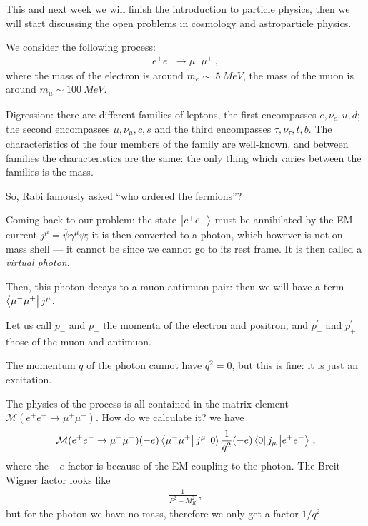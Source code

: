 \documentclass[main.tex]{subfiles}
\begin{document}

This and next week we will finish the introduction to particle physics, then we will start discussing the open problems in cosmology and astroparticle physics. 

We consider the following process: 
%
\begin{align}
e^{+} e^{-} \to \mu^- \mu^+
\,,
\end{align}
%
where the mass of the electron is around \(m_e \sim \SI{.5}{MeV}\), the mass of the muon is around \(m_{\mu } \sim \SI{100}{MeV}\). 

Digression: there are different families of leptons, the first encompasses \(e, \nu_{e}, u, d\); the second encompasses \(\mu, \nu_{\mu }, c, s\) and the third encompasses \(\tau, \nu_{\tau }, t, b\). 
The characteristics of the four members of the family are well-known, and between families the characteristics are the same: the only thing which varies between the families is the mass. 

So, Rabi famously asked ``who ordered the fermions''? 

Coming back to our problem: the state \(\ket{e^{+}e^{-}}\) must be annihilated by the EM current \(j^{\mu } = \overline{\psi} \gamma^{\mu } \psi \); it is then converted to a photon, which however is not on mass shell --- it cannot be since we cannot go to its rest frame. 
It is then called a \emph{virtual photon}. 

Then, this photon decays to a muon-antimuon pair: then we will have a term \(\bra{\mu^- \mu^+} j^{\mu }\).

Let us call \(p_{-}\) and \(p_{+}\) the momenta of the electron and positron, and \(p^{\prime }_{-}\) and \(p^{\prime }_{+}\) those of the muon and antimuon. 

The momentum \(q\) of the photon cannot have \(q^2  =0 \), but this is fine: it is just an excitation. 

The physics of the process is all contained in the matrix element \(\mathcal{M}(e^{+}e^{-} \to \mu^+ \mu^-)\). How do we calculate it? we have 
%
\begin{align}
\mathcal{M}(e^{+}e^{-} \to \mu^+ \mu^-)
(-e)
\bra{\mu^- \mu^+} j^{\mu } \ket{0}
\frac{1}{q^2}
(-e)
\bra{0} j_{\mu } \ket{e^{+} e^{-}}
\,,
\end{align}
%
where the \(-e\) factor is because of the EM coupling to the photon. 
The Breit-Wigner factor looks like 
%
\begin{align}
\frac{1}{P^2-M_R^2}
\,,
\end{align}
%
but for the photon we have no mass, therefore we only get a factor \(1/q^2\). 
\end{document}
